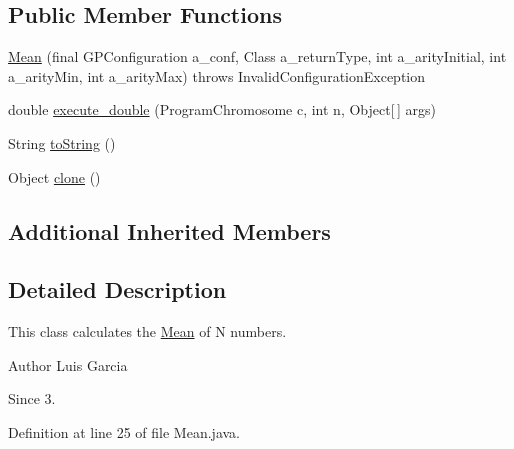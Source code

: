 \subsection*{Public Member Functions}
\begin{DoxyCompactItemize}
\item 
\hyperlink{classorg_1_1jgap_1_1gp_1_1function_1_1statistics_1_1_mean_add409108ee0df598c652479421646508}{Mean} (final G\-P\-Configuration a\-\_\-conf, Class a\-\_\-return\-Type, int a\-\_\-arity\-Initial, int a\-\_\-arity\-Min, int a\-\_\-arity\-Max)  throws Invalid\-Configuration\-Exception 
\item 
double \hyperlink{classorg_1_1jgap_1_1gp_1_1function_1_1statistics_1_1_mean_a7ddccbf4b7713903001abde9a940d0f1}{execute\-\_\-double} (Program\-Chromosome c, int n, Object\mbox{[}$\,$\mbox{]} args)
\item 
String \hyperlink{classorg_1_1jgap_1_1gp_1_1function_1_1statistics_1_1_mean_af3444b4ab9390cdde9df376e8b96e05d}{to\-String} ()
\item 
Object \hyperlink{classorg_1_1jgap_1_1gp_1_1function_1_1statistics_1_1_mean_a2c03dec1ec13f4e1c6d0edc536a3b131}{clone} ()
\end{DoxyCompactItemize}
\subsection*{Additional Inherited Members}


\subsection{Detailed Description}
This class calculates the \hyperlink{classorg_1_1jgap_1_1gp_1_1function_1_1statistics_1_1_mean}{Mean} of N numbers.

\begin{DoxyAuthor}{Author}
Luis Garcia
\end{DoxyAuthor}
\begin{DoxySince}{Since}
3. 
\end{DoxySince}


Definition at line 25 of file Mean.\-java.



